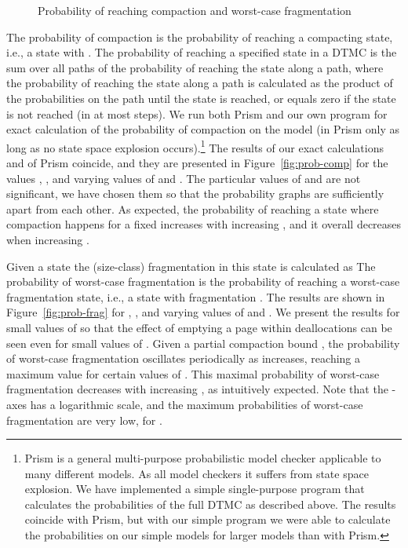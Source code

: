 \documentclass{amsart}
\begin{document}
\begin{figure*}
\begin{center}
\caption{Probability of reaching compaction and worst-case fragmentation}
\end{center}
\end{figure*}

The probability of compaction
is the probability of reaching a compacting state, i.e.,
a state with . The probability of reaching a specified state
in a DTMC is  the sum over all paths of the probability of
reaching the state along a path, where the probability of reaching the
state along a path is calculated as the product of the probabilities on the
path until the state is reached, or equals zero if the state is not reached (in at most  steps).
We run both Prism and our own program for exact calculation of the probability of compaction
 on the model
(in Prism only as long as no state space explosion occurs).\footnote{{Prism is a general multi-purpose probabilistic model checker applicable to many different models. As all model checkers it suffers from state space explosion. We have implemented a simple single-purpose program that calculates the probabilities of the full DTMC as described above. The results coincide with Prism, but with our simple program we were able to calculate the probabilities on our simple models for larger models than with Prism.}}
The results of
our exact calculations and of Prism coincide, and they are presented
in Figure~\ref{fig:prob-comp} for the values , ,
and varying values of  and . The particular values of  and  are not significant,
we have chosen them so that the probability graphs are sufficiently apart from each other.
As expected, the probability of reaching a state where
compaction happens for a fixed  increases with increasing , and
it overall decreases when increasing .

Given a state  the (size-class) fragmentation in this state is calculated as
 The probability  of worst-case fragmentation is the probability of reaching a worst-case fragmentation
state, i.e., a state with fragmentation .
The results are shown in Figure~\ref{fig:prob-frag} for , ,
 and varying values of  and . We present the results for small values of  so that the effect of emptying a
page within  deallocations can be seen even for small values of .
 Given a partial compaction bound , the probability of
worst-case fragmentation oscillates periodically as  increases, reaching a maximum value for certain values of .
This maximal probability of worst-case fragmentation decreases with increasing , as intuitively expected.
Note that the -axes has a logarithmic scale, and the maximum probabilities of worst-case fragmentation are
very low, for .
\end{document}
